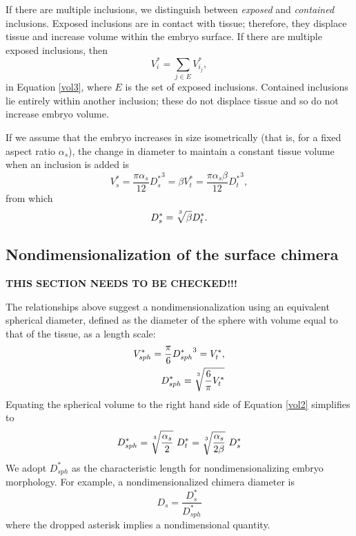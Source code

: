 \documentclass[10pt,a4paper]{article}
\def\non{\nonumber}
\begin{document}
If there are multiple inclusions, we distinguish between \textit{exposed} and \textit{contained} inclusions. 
Exposed inclusions are in contact with tissue; therefore, they displace tissue and increase volume within the embryo surface.  
If there are multiple exposed inclusions, then 
\begin{equation}\label{eqn:expincl}
	V_i^* = \sum_{j \in E} V^*_{i_j},
\end{equation}
in  Equation \ref{vol3}, where $E$ is the set of exposed inclusions.
Contained inclusions lie entirely within another inclusion; these do not displace tissue and so do not increase embryo volume.


If we assume that the embryo increases in size isometrically (that is, for a fixed aspect ratio $\alpha_s$), the change in diameter to maintain a constant tissue volume when an inclusion is added is
\begin{equation}\label{vol4}
	V_s^*  = \frac{\pi \alpha_s}{12}{D_s^*}^3 = \beta V_t^* = \frac{\pi \alpha_s \beta}{12}{D_t^*}^3,
\end{equation} 
from which 
\begin{equation}\label{vol5}
	D_s^* = \sqrt[\uproot{5}3]{\beta} D_t^*.
\end{equation}




\subsection{Nondimensionalization of the surface chimera}
\textbf{THIS SECTION NEEDS TO BE CHECKED!!!}

The relationships above suggest a nondimensionalization using an equivalent spherical diameter, defined as the diameter of the sphere with volume equal to that of the tissue, as a length scale:
\begin{eqnarray}\label{equivsphere}
	V_{sph}^* = \frac{\pi}{6} {D_{sph}^*}^3 = V_t^*, \non \\
	D_{sph}^* = \sqrt[\uproot{5}3]{\frac{6}{\pi} V_t^*}
\end{eqnarray} 
Equating the spherical volume to the right hand side of Equation \ref{vol2} simplifies to
\begin{equation}\label{equivD}
	D_{sph}^* = \sqrt[\uproot{5}3]{\frac{\alpha_s}{2}} ~ D_t^* = \sqrt[\uproot{5}3]{\frac{\alpha_s}{2 \beta}} ~ D_s^*
\end{equation} 
We adopt $D_{sph}^*$ as the characteristic length for nondimensionalizing embryo morphology.
For example, a nondimensionalized chimera diameter is
\begin{equation}\label{ndD}
	D_s = \frac{D_s^*}{D_{sph}^*}
\end{equation} 
where the dropped asterisk implies a nondimensional quantity.
\end{document}
